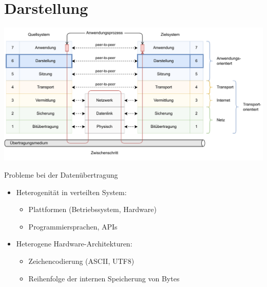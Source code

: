 \section{Darstellung}

\includegraphics[width=\textwidth]{includes/figures/defi_iso_osi_presentation.pdf}

\begin{bonus}{Probleme bei der Datenübertragung}
    \begin{itemize}
        \item Heterogenität in verteilten System:

              \begin{itemize}
                  \item Plattformen (Betriebssystem, Hardware)
                  \item Programmiersprachen, APIs
              \end{itemize}
        \item Heterogene Hardware-Architekturen:

              \begin{itemize}
                  \item Zeichencodierung (ASCII, UTF8)
                  \item Reihenfolge der internen Speicherung von Bytes
              \end{itemize}
    \end{itemize}
\end{bonus}

